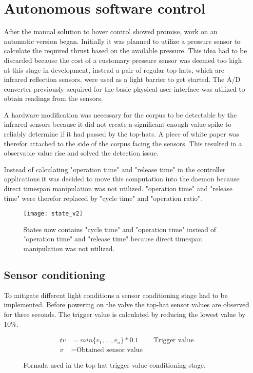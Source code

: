 \section{Autonomous software control}
\author{Philip Trauner}

After the manual solution to hover control showed promise, work on an automatic version began. Initially it was planned to utilize a pressure sensor to calculate the required thrust based on the available pressure. This idea had to be discarded because the cost of a customary pressure sensor was deemed too high at this stage in development, instead a pair of regular top-hats, which are infrared reflection sensors, were used as a light barrier to get started. The A/D converter previously acquired for the basic physical user interface was utilized to obtain readings from the sensors.

A hardware modification was necessary for the corpus to be detectable by the infrared sensors because it did not create a significant enough value spike to reliably determine if it had passed by the top-hats.
A piece of white paper was therefor attached to the side of the corpus facing the sensors. This resulted in a observable value rise and solved the detection issue.

Instead of calculating "operation time" and "release time" in the controller applications it was decided to move this computation into the daemon because direct timespan manipulation was not utilized. "operation time" and "release time" were therefor replaced by "cycle time" and "operation ratio".

\begin{figure}[h]
\centering

\texttt{[image: state\_v2]}

\caption{States now contains "cycle time" and "operation time" instead of "operation time" and "release time" because direct timespan manipulation was not utilized.}
\end{figure}

\subsection{Sensor conditioning}
To mitigate different light conditions a sensor conditioning stage had to be implemented. Before powering on the valve the top-hat sensor values are observed for three seconds. The trigger value is calculated by reducing the lowest value by 10\%.
\begin{figure}[h]
\begin{align*}
    tv &=min\{v_1, \dots, v_n\} * 0.1 && \text{Trigger value} \\
    v &= \text{Obtained sensor value}
\end{align*}
\caption{Formula used in the top-hat trigger value conditioning stage.}
\end{figure}

